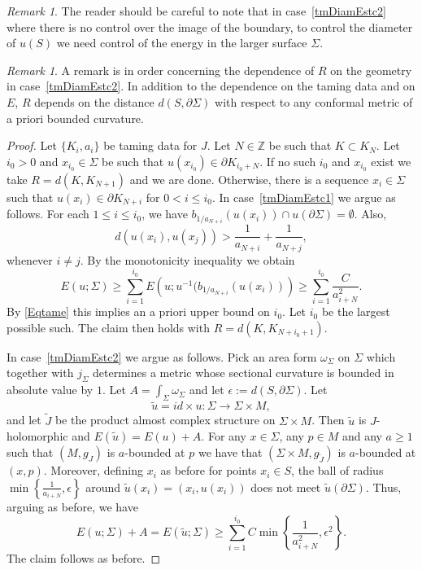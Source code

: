 \documentclass[11pt]{amsart}
\newcommand{\Z}{\mathbb{Z}}
\theoremstyle{definition}
\theoremstyle{remark}
\newtheorem{rem}[tm]{Remark}
\begin{document}
\begin{rem}
The reader should be careful to note that in case~\ref{tmDiamEstc2} where there is no control over the image of the boundary, to control the diameter of $u(S)$  we need control of the energy in the larger surface $\Sigma$.
\end{rem}
\begin{rem}
A remark is in order concerning the dependence of $R$ on the geometry in case~\ref{tmDiamEstc2}. In addition to the dependence on the taming data and on $E$, $R$ depends on the distance $d( S,\partial\Sigma)$ with respect to any conformal metric of a priori bounded curvature.
\end{rem}

\begin{proof}
Let $\{K_i,a_i\}$ be taming data for $J$. Let $N\in\Z$ be such that $K\subset K_N$. Let $i_0>0$ and $x_{i_0}\in\Sigma$ be such that $u(x_{i_0})\in\partial K_{i_0+N}$. If no such $i_0$ and $x_{i_0}$ exist we take $R=d(K,K_{N+1})$ and we are done. Otherwise, there is a sequence $x_i\in\Sigma$ such that $u(x_i)\in\partial K_{N+i}$ for $0<i\leq i_0$.
In case~\ref{tmDiamEstc1} we argue as follows. For each $1\leq i\leq i_0$, we have $b_{1/a_{N+i}}(u(x_i))\cap u(\partial \Sigma)=\emptyset$. Also,
\[
d(u(x_i),u(x_j))>\frac1{a_{N+i}}+\frac1{a_{N+j}},
\]
whenever $i\neq j$. By the monotonicity inequality we obtain
\[
E(u;\Sigma)\geq\sum_{i=1}^{i_0}E\left(u;u^{-1}(b_{1/a_{N+i}}(u(x_i))\right)\geq \sum_{i=1}^{i_0}\frac{C}{a^2_{i+N}}.
\]
By \eqref{Eqtame} this implies an a priori upper bound on $i_0$. Let $i_0$ be the largest possible such. The claim then holds with $R=d(K,K_{N+i_0+1})$.

In case~\ref{tmDiamEstc2} we argue as follows. Pick an area form $\omega_{\Sigma}$ on $\Sigma$ which together with $j_\Sigma$ determines a metric whose sectional curvature is bounded in absolute value by $1$. Let $A=\int_{\Sigma}\omega_{\Sigma}$ and let $\epsilon:=d(S,\partial\Sigma)$.  Let
\[
\tilde{u}=id\times u:\Sigma\to \Sigma\times M,
\]
and let $\tilde{J}$ be the product almost complex structure on $\Sigma\times M$. Then $\tilde{u}$ is $J$-holomorphic and $E(\tilde{u})= E(u)+A$. For any $x\in\Sigma$, any $p\in M$ and any $a\geq 1$ such that $(M,g_J)$ is $a$-bounded at $p$ we have that $(\Sigma\times M,g_{\tilde{J}})$ is $a$-bounded at $(x,p)$. Moreover, defining $x_i$ as before for points $x_i\in S$, the ball of radius $\min\left\{\frac1{a_{i+N}},\epsilon\right\}$ around $\tilde{u}(x_i)=(x_i,u(x_i))$ does not meet $\tilde{u}(\partial\Sigma)$. Thus, arguing as before, we have
\[
E(u;\Sigma)+A=E(\tilde{u};\Sigma)\geq\sum_{i=1}^{i_0}C\min\left\{\frac1{a^2_{i+N}},\epsilon^2\right\}.
\]
The claim follows as before.

\end{proof}
\end{document}
